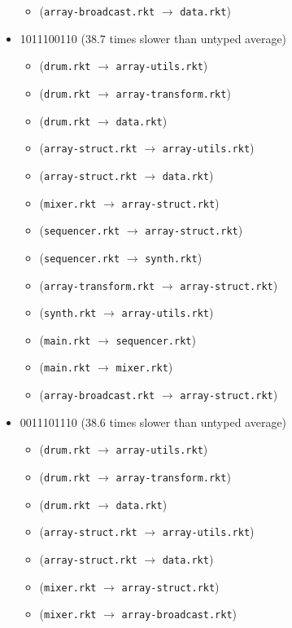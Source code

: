 \documentclass{article}
\newcommand{\mono}[1]{\texttt{#1}}
\begin{document}
\begin{itemize}
\begin{itemize}
  \item (\mono{array-broadcast.rkt} $\rightarrow$ \mono{data.rkt})
  \end{itemize}
\item 1011100110 (38.7 times slower than untyped average)
  \begin{itemize}
  \item (\mono{drum.rkt} $\rightarrow$ \mono{array-utils.rkt})
  \item (\mono{drum.rkt} $\rightarrow$ \mono{array-transform.rkt})
  \item (\mono{drum.rkt} $\rightarrow$ \mono{data.rkt})
  \item (\mono{array-struct.rkt} $\rightarrow$ \mono{array-utils.rkt})
  \item (\mono{array-struct.rkt} $\rightarrow$ \mono{data.rkt})
  \item (\mono{mixer.rkt} $\rightarrow$ \mono{array-struct.rkt})
  \item (\mono{sequencer.rkt} $\rightarrow$ \mono{array-struct.rkt})
  \item (\mono{sequencer.rkt} $\rightarrow$ \mono{synth.rkt})
  \item (\mono{array-transform.rkt} $\rightarrow$ \mono{array-struct.rkt})
  \item (\mono{synth.rkt} $\rightarrow$ \mono{array-utils.rkt})
  \item (\mono{main.rkt} $\rightarrow$ \mono{sequencer.rkt})
  \item (\mono{main.rkt} $\rightarrow$ \mono{mixer.rkt})
  \item (\mono{array-broadcast.rkt} $\rightarrow$ \mono{array-struct.rkt})
  \end{itemize}
\item 0011101110 (38.6 times slower than untyped average)
  \begin{itemize}
  \item (\mono{drum.rkt} $\rightarrow$ \mono{array-utils.rkt})
  \item (\mono{drum.rkt} $\rightarrow$ \mono{array-transform.rkt})
  \item (\mono{drum.rkt} $\rightarrow$ \mono{data.rkt})
  \item (\mono{array-struct.rkt} $\rightarrow$ \mono{array-utils.rkt})
  \item (\mono{array-struct.rkt} $\rightarrow$ \mono{data.rkt})
  \item (\mono{mixer.rkt} $\rightarrow$ \mono{array-struct.rkt})
  \item (\mono{mixer.rkt} $\rightarrow$ \mono{array-broadcast.rkt})

\end{itemize}
\end{itemize}
\end{document}
